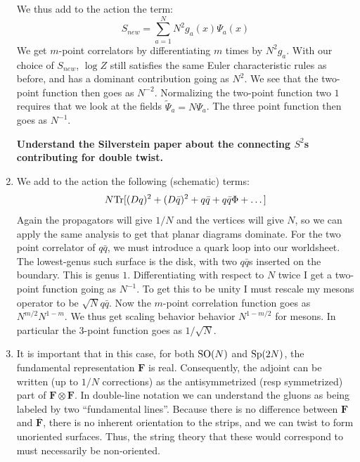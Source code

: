 \documentclass[11pt, class=article, crop=false]{standalone}
\begin{document}
\begin{enumerate}
	We thus add to the action the term:
	\[
		S_{new} = \sum_{a=1}^N N^2 g_a(x) \Psi_a(x)
	\]
	We get $m$-point correlators by differentiating $m$ times by $N^2 g_a$. With our choice of $S_{new}$, $\log Z$ still satisfies the same Euler characteristic rules as before, and has a dominant contribution going as $N^2$. We see that the two-point function then goes as $N^{-2}$. Normalizing the two-point function two $1$ requires that we look at the fields $\tilde \Psi_a = N \Psi_a$. The three point function then goes as $N^{-1}$.
	
	\textbf{Understand the Silverstein paper about the connecting $S^2$s contributing for double twist.}
	
	\item We add to the action the following (schematic) terms:
	\[
		N \mathrm{Tr}[(D q)^2 + (D \bar q)^2 + q \bar q + q \bar q \Phi + \dots ]
	\]
	Again the propagators will give $1/N$ and the vertices will give $N$, so we can apply the same analysis to get that planar diagrams dominate. For the two point correlator of $q \bar q$, we must introduce a quark loop into our worldsheet. The lowest-genus such surface is the disk, with two $q \bar q$s inserted on the boundary. This is genus $1$. Differentiating with respect to $N$ twice I get a two-point function going as $N^{-1}$. To get this to be unity I must rescale my mesons operator to be $\sqrt{N} q \bar q$. Now the $m$-point correlation function goes as $N^{m/2} N^{1-m}$.
	We thus get scaling behavior behavior $N^{1-m/2}$ for mesons. In particular the 3-point function goes as $1/\sqrt{N}$. 
	
	
	\item It is important that in this case, for both $\mathrm{SO}(N)$ and $\mathrm{Sp}(2N)$, the fundamental representation $\mathbf{F}$ is real. Consequently, the adjoint can be written (up to $1/N$ corrections) as the antisymmetrized (resp symmetrized) part of $\mathbf{F} \otimes \mathbf{F}$. In double-line notation we can understand the gluons as being labeled by two ``fundamental lines''. Because there is no difference between $\mathbf{F}$ and $\overline{\mathbf{F}}$, there is no inherent orientation to the strips, and we can twist to form unoriented surfaces. Thus, the string theory that these would correspond to must necessarily be non-oriented. 
	

\end{enumerate}
\end{document}
